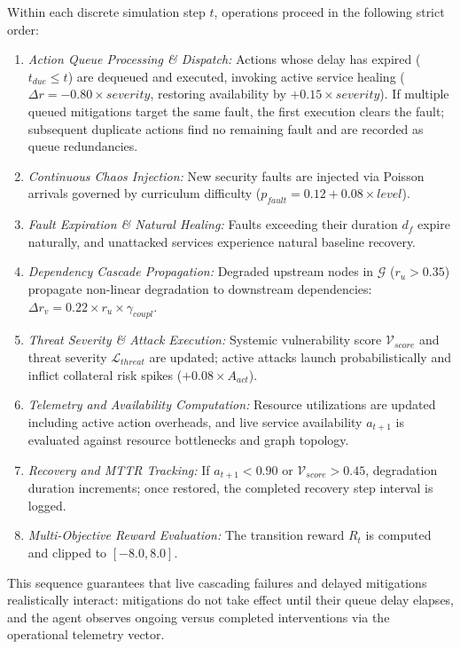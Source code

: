 \documentclass[11pt,a4paper]{article}
\begin{document}
Within each discrete simulation step $t$, operations proceed in the following strict order:
\begin{enumerate}
    \item \textit{Action Queue Processing \& Dispatch:} Actions whose delay has expired ($t_{due} \le t$) are dequeued and executed, invoking active service healing ($\Delta r = -0.80 \times severity$, restoring availability by $+0.15 \times severity$). If multiple queued mitigations target the same fault, the first execution clears the fault; subsequent duplicate actions find no remaining fault and are recorded as queue redundancies.
    \item \textit{Continuous Chaos Injection:} New security faults are injected via Poisson arrivals governed by curriculum difficulty ($p_{fault} = 0.12 + 0.08 \times level$).
    \item \textit{Fault Expiration \& Natural Healing:} Faults exceeding their duration $d_f$ expire naturally, and unattacked services experience natural baseline recovery.
    \item \textit{Dependency Cascade Propagation:} Degraded upstream nodes in $\mathcal{G}$ ($r_u > 0.35$) propagate non-linear degradation to downstream dependencies: $\Delta r_v = 0.22 \times r_u \times \gamma_{coupl}$.
    \item \textit{Threat Severity \& Attack Execution:} Systemic vulnerability score $\mathcal{V}_{score}$ and threat severity $\mathcal{L}_{threat}$ are updated; active attacks launch probabilistically and inflict collateral risk spikes ($+0.08 \times A_{act}$).
    \item \textit{Telemetry and Availability Computation:} Resource utilizations are updated including active action overheads, and live service availability $a_{t+1}$ is evaluated against resource bottlenecks and graph topology.
    \item \textit{Recovery and MTTR Tracking:} If $a_{t+1} < 0.90$ or $\mathcal{V}_{score} > 0.45$, degradation duration increments; once restored, the completed recovery step interval is logged.
    \item \textit{Multi-Objective Reward Evaluation:} The transition reward $R_t$ is computed and clipped to $[-8.0, 8.0]$.
\end{enumerate}
This sequence guarantees that live cascading failures and delayed mitigations realistically interact: mitigations do not take effect until their queue delay elapses, and the agent observes ongoing versus completed interventions via the operational telemetry vector.
\end{document}
